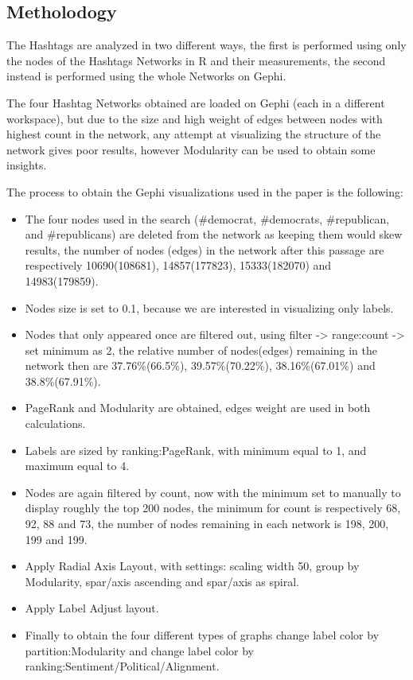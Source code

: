 \documentclass[twoside,twocolumn]{article}
\begin{document}
	\subsection{Metholodogy}
	The Hashtags are analyzed in two different ways, the first is performed using only the nodes of the Hashtags Networks in R and their measurements, the second instead is performed using the whole Networks on Gephi.
	
	The four Hashtag Networks obtained are loaded on Gephi (each in a different workspace), but due to the size and high weight of edges between nodes with highest count in the network, any attempt at visualizing the structure of the network gives poor results, however Modularity can be used to obtain some insights.
	
	The process to obtain the Gephi visualizations used in the paper is the following:
	\begin{itemize}[noitemsep]
		\item The four nodes used in the search (\#democrat, \#democrats, \#republican, and \#republicans) are deleted from the network as keeping them would skew results, the number of nodes (edges) in the network after this passage are respectively 10690(108681), 14857(177823), 15333(182070) and 14983(179859).
		\item Nodes size is set to 0.1, because we are interested in visualizing only labels.
		\item Nodes that only appeared once are filtered out, using filter -> range:count -> set minimum as 2, the relative number of nodes(edges) remaining in the network then are 37.76\%(66.5\%), 39.57\%(70.22\%), 38.16\%(67.01\%) and 38.8\%(67.91\%).
		\item PageRank and Modularity are obtained, edges weight are used in both calculations.
		\item Labels are sized by ranking:PageRank, with minimum equal to 1, and maximum equal to 4.
		\item Nodes are again filtered by count, now with the minimum set to manually to display roughly the top 200 nodes, the minimum for count is respectively 68, 92, 88 and 73, the number of nodes remaining in each network is 198, 200, 199 and 199.
		\item Apply Radial Axis Layout, with settings: scaling width 50, group by Modularity, spar/axis ascending and spar/axis as spiral.
		\item Apply Label Adjust layout.
		\item Finally to obtain the four different types of graphs change label color by partition:Modularity and change label color by ranking:Sentiment/Political/Alignment.
	\end{itemize}
\end{document}
